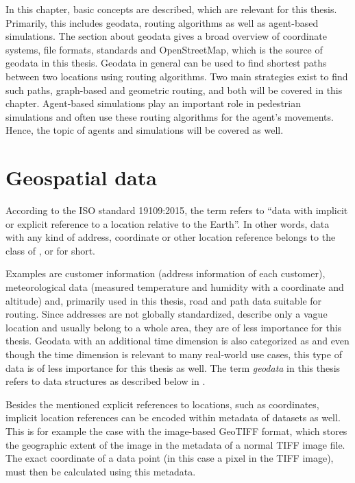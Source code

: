 
In this chapter, basic concepts are described, which are relevant for this thesis.
Primarily, this includes geodata, routing algorithms as well as agent-based simulations.
The section about geodata gives a broad overview of coordinate systems, file formats, standards and OpenStreetMap, which is the source of geodata in this thesis.
Geodata in general can be used to find shortest paths between two locations using routing algorithms.
Two main strategies exist to find such paths, graph-based and geometric routing, and both will be covered in this chapter.
Agent-based simulations play an important role in pedestrian simulations and often use these routing algorithms for the agent's movements.
Hence, the topic of agents and simulations will be covered as well.

\section{Geospatial data}

	According to the ISO standard 19109:2015\cite{iso-19109}, the term  refers to \enquote{data with implicit or explicit reference to a location relative to the Earth}.
	In other words, data with any kind of address, coordinate or other location reference belongs to the class of , or  for short.
	
	Examples are customer information (address information of each customer), meteorological data (measured temperature and humidity with a coordinate and altitude) and, primarily used in this thesis, road and path data suitable for routing.
	Since addresses are not globally standardized, describe only a vague location and usually belong to a whole area, they are of less importance for this thesis.
	Geodata with an additional time dimension is also categorized as \cite{iso-19108} and even though the time dimension is relevant to many real-world use cases, this type of data is of less importance for this thesis as well.
	The term \emph{geodata} in this thesis refers to data structures as described below in .
	
	Besides the mentioned explicit references to locations, such as coordinates, implicit location references can be encoded within metadata of datasets as well.
	This is for example the case with the image-based GeoTIFF format, which stores the geographic extent of the image in the metadata of a normal TIFF image file\cite{ogc-geotiff}.
	The exact coordinate of a data point (in this case a pixel in the TIFF image), must then be calculated using this metadata.

